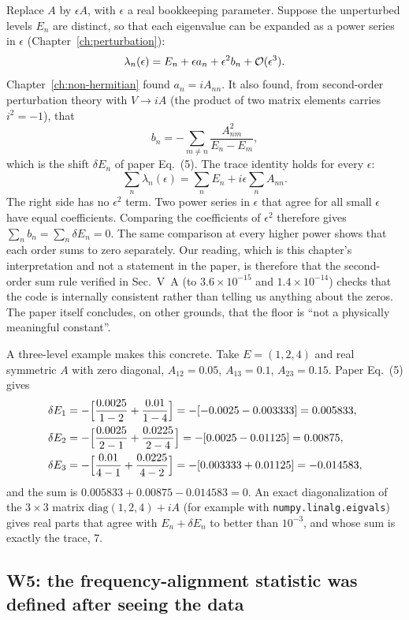 Replace $A$ by $\epsilon A$, with $\epsilon$ a real bookkeeping parameter. Suppose the unperturbed levels $E_n$ are distinct, so that each eigenvalue can be expanded as a power series in $\epsilon$ (Chapter~\ref{ch:perturbation}):
\[
\lambda_n(\epsilon)=E_n+\epsilon a_n+\epsilon^2 b_n+\mathcal{O}(\epsilon^3).
\]
Chapter~\ref{ch:non-hermitian} found $a_n=iA_{nn}$. It also found, from second-order perturbation theory with $V\to iA$ (the product of two matrix elements carries $i^2=-1$), that
\[
b_n=-\sum_{m\ne n}\frac{A_{nm}^2}{E_n-E_m},
\]
which is the shift $\delta E_n$ of paper Eq.~(5). The trace identity holds for every $\epsilon$:
\[
\sum_n\lambda_n(\epsilon)=\sum_nE_n+i\epsilon\sum_nA_{nn}.
\]
The right side has no $\epsilon^2$ term. Two power series in $\epsilon$ that agree for all small $\epsilon$ have equal coefficients. Comparing the coefficients of $\epsilon^2$ therefore gives $\sum_n b_n=\sum_n\delta E_n=0$. The same comparison at every higher power shows that each order sums to zero separately. Our reading, which is this chapter's interpretation and not a statement in the paper, is therefore that the second-order sum rule verified in Sec.~V~A (to $3.6\times10^{-15}$ and $1.4\times10^{-14}$) checks that the code is internally consistent rather than telling us anything about the zeros. The paper itself concludes, on other grounds, that the floor is ``not a physically meaningful constant''.

A three-level example makes this concrete. Take $E=(1,2,4)$ and real symmetric $A$ with zero diagonal, $A_{12}=0.05$, $A_{13}=0.1$, $A_{23}=0.15$. Paper Eq.~(5) gives
\begin{align*}
\delta E_1&=-\Bigl[\frac{0.0025}{1-2}+\frac{0.01}{1-4}\Bigr]=-[-0.0025-0.003333]=0.005833,\\
\delta E_2&=-\Bigl[\frac{0.0025}{2-1}+\frac{0.0225}{2-4}\Bigr]=-[0.0025-0.01125]=0.00875,\\
\delta E_3&=-\Bigl[\frac{0.01}{4-1}+\frac{0.0225}{4-2}\Bigr]=-[0.003333+0.01125]=-0.014583,
\end{align*}
and the sum is $0.005833+0.00875-0.014583=0$. An exact diagonalization of the $3\times3$ matrix $\mathrm{diag}(1,2,4)+iA$ (for example with \texttt{numpy.linalg.eigvals}) gives real parts that agree with $E_n+\delta E_n$ to better than $10^{-3}$, and whose sum is exactly the trace, 7.

\subsection{W5: the frequency-alignment statistic was defined after seeing the data}

